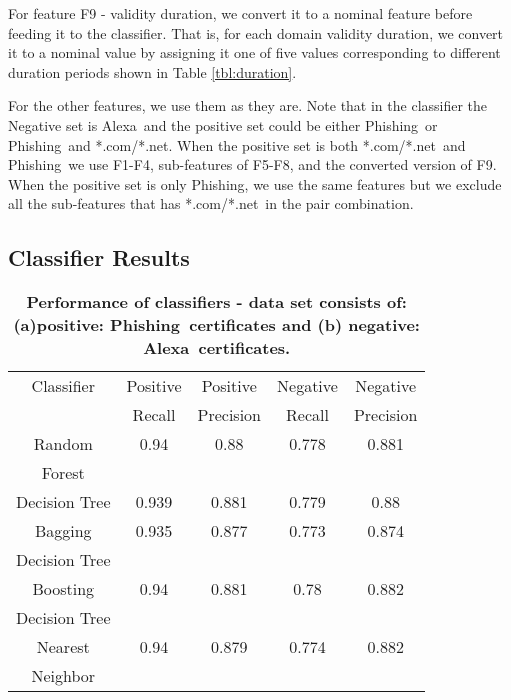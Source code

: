 \documentclass[twocolumn]{article}
\newcommand{\Alexa}{\textsf{Alexa}}
\newcommand{\phishing}{\textsf{Phishing}}
\newcommand{\comnet}{\textsf{*.com/*.net}}
\begin{document}
For feature F9 - validity duration, we convert it to a nominal feature before feeding it to the classifier. That is, for each domain validity duration, we convert it to a nominal value by assigning it one of five values corresponding to different duration periods shown in Table \ref{tbl:duration}. 

For the other features, we use them as they are. Note that in the classifier the Negative set is \Alexa\ and the positive set could be either \phishing\ or \phishing\ and \comnet. When the positive set is both \comnet\ and \phishing\ we use F1-F4, sub-features of F5-F8, and the converted version of F9. When the positive set is only \phishing, we use the same features but we exclude all the sub-features that has \comnet\ in the pair combination. 


\subsection{Classifier Results}\label{sec:classresults}
\begin{table}[t]
\centering
{\footnotesize
\begin{tabular}{|c|c|c|c|c|}
\hline

Classifier & Positive & Positive & Negative & Negative\\
        & Recall & Precision & Recall & Precision\\
\hline
Random & 0.94 & 0.88 & 0.778  & 0.881\\
Forest &&&&\\
\hline
Decision Tree  & 0.939 & 0.881  & 0.779  & 0.88\\
\hline
Bagging & 0.935 & 0.877 & 0.773  & 0.874 \\
Decision Tree  & & &  & \\
\hline
Boosting  & 0.94 & 0.881 & 0.78  & 0.882\\
Decision Tree  & & &  & \\
\hline
Nearest  & 0.94  & 0.879  & 0.774  & 0.882 \\
Neighbor&&&&\\
\hline
\end{tabular}
}
\vspace{-0.1cm}
\caption{\bf Performance of classifiers - data set consists of: (a)positive: \phishing\ certificates
 and (b) negative: \Alexa\ certificates.}
\label{tab:class-1}
\end{table}
\end{document}
